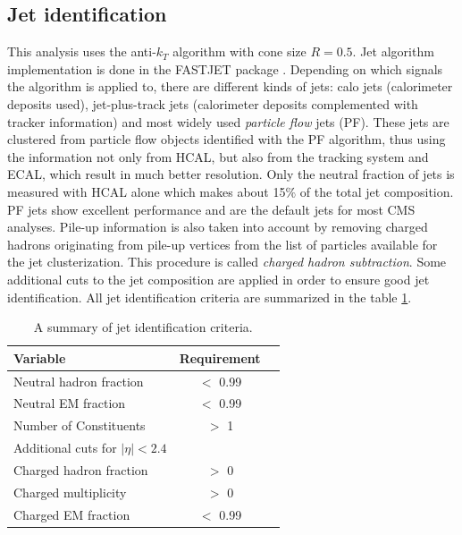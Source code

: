 \subsection{Jet identification}
\label{sec:jetID}
This analysis uses the anti-$k_T$ algorithm with cone size $R=0.5$. Jet algorithm implementation is done in the FASTJET package \cite{Cacciari:2011ma}. Depending on which signals the algorithm is applied to, there are different kinds of jets: calo jets (calorimeter deposits used), jet-plus-track jets (calorimeter deposits complemented with tracker information) and most widely used \textit{particle flow} jets (PF). These jets are clustered from particle flow objects identified with the PF algorithm, thus using the information not only from HCAL, but also from the tracking system and ECAL, which result in much better resolution. Only the neutral fraction of  jets is measured with HCAL alone which makes about 15$\%$ of the total jet composition. PF jets show excellent performance and are the default jets for most CMS analyses. Pile-up information is also taken into account by removing charged hadrons originating from pile-up vertices from the list of particles available for the jet clusterization. This procedure is called \textit{charged hadron subtraction}. Some additional cuts to the jet composition are applied in order to ensure good jet identification. All jet identification criteria are summarized in the table \ref{tab:jetID}.  
  \begin{table}[h]
\centering
  \caption{A summary of jet identification criteria.}
  \label{tab:jetID}
  \begin{tabular}{ l  c c}
      \hline
      \hline
      	Variable & Requirement \\
      	\hline
    		Neutral hadron fraction & $<$ 0.99  \\
     	Neutral EM fraction & $<$ 0.99 \\
     	Number of Constituents & $>$ 1 \\		
		\hline
		Additional cuts for $|\eta|<2.4$ \\
		\hline
		Charged hadron fraction & $>$ 0 \\ 
		Charged multiplicity & $>$ 0 \\
		Charged EM fraction & $<$ 0.99 \\
      \hline
      \hline 
  \end{tabular}
\end{table}


